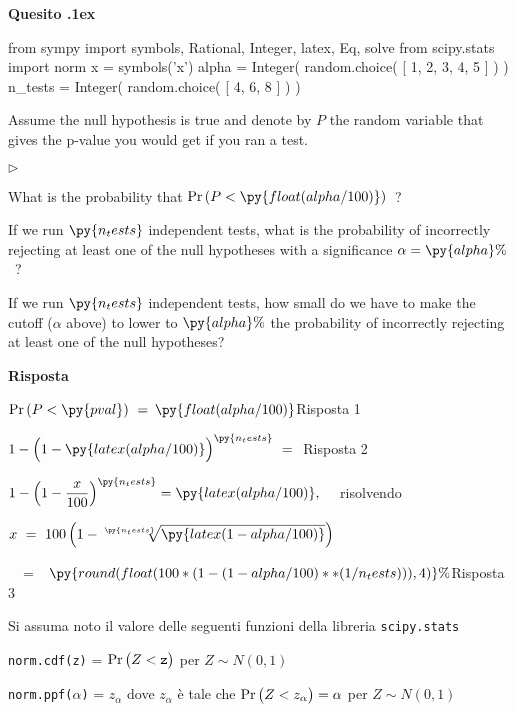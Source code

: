\documentclass[11pt,twoside,a4paper]{article}
\newcommand{\mylabel}[1]{#1\hfill}
\renewenvironment{itemize}
  {\begin{list}{$\triangleright$}{%
   \setlength{\parskip}{0mm}
   \setlength{\topsep}{.4\baselineskip}
   \setlength{\rightmargin}{0mm}
   \setlength{\listparindent}{0mm}
   \setlength{\itemindent}{0mm}
   \setlength{\labelwidth}{2ex}
   \setlength{\itemsep}{.4\baselineskip}
   \setlength{\parsep}{0mm}
   \setlength{\partopsep}{0mm}
   \setlength{\labelsep}{1ex}
   \setlength{\leftmargin}{\labelwidth+\labelsep}
   \let\makelabel\mylabel}}{%
   \end{list}\vspace*{-1.3mm}}
\def\Pr{{\rm Pr\,}}
\newcounter{quesito}
\newenvironment{question}{\bigskip\addtocounter{quesito}{1}\par\textbf{Quesito \thequesito.\kern1ex}}{\vspace{\parskip}}
\newenvironment{answer}{\par\textbf{Risposta\quad}}{\vspace{\parskip}}
\begin{document}
\clearpage
\begin{question} %
\begin{pycode}
from sympy import symbols, Rational, Integer, latex, Eq, solve
from scipy.stats import norm
x = symbols('x')
alpha = Integer( random.choice( [ 1, 2, 3, 4, 5 ] ) )
n_tests = Integer( random.choice( [ 4, 6, 8 ] ) )
\end{pycode}
Assume the null hypothesis is true and denote by $P$ the random variable that gives the p-value you would get if you ran a test.

\begin{itemize}
\item[1.] What is the probability that $\Pr(P<\py{float(alpha/100) })$~?

\item[2.] If we run $\py{n_tests}$ independent tests, what is the probability of incorrectly rejecting at least one of the null hypotheses with a significance $\alpha=\py{alpha}\%$~?

\item[3.] If we run $\py{n_tests}$ independent tests, how small do we have to make the cutoff ($\alpha$ above) to lower to $\py{alpha}\%$ the probability of incorrectly rejecting at least one of the null hypotheses? 
\end{itemize}

\begin{answer}

$\Pr(P<\py{pval})\ =\ ${\color{blue}$\py{float(alpha/100) }$\hfill Risposta 1}


$\displaystyle 1-\Big(1-\py{latex(alpha/100) }\Big)^{\py{n_tests}}\ =\  ${\color{blue} \hfill Risposta 2}

$\displaystyle 1-\Big(1-\frac{x}{100}\Big)^{\py{n_tests}}=\py{latex(alpha/100) }, \quad$ 
risolvendo 

$\displaystyle x\ =\ 100\,\Big( 1-\sqrt[\py{n_tests}]{\py{latex(1-alpha/100) } }\Big)$\medskip

$\displaystyle\phantom{x}\ =$ {\color{blue}$\kern1ex\py{round(float( 100*( 1- (1-alpha/100)**(1/n_tests) ) ), 4) }\%$\hfill Risposta 3}




\end{answer}
\end{question}











\vfill
\hrulefill

Si assuma noto il valore delle seguenti funzioni della libreria {\tt scipy.stats\/}

{\tt norm.cdf(z)} = $\Pr\big(Z<{\tt z}\big)$ per $Z\sim N(0,1)$ 

{\tt norm.ppf($\alpha$)} = $z_\alpha$ dove $z_\alpha$ è tale che $\Pr\big(Z<z_\alpha\big)=\alpha$ per $Z\sim N(0,1)$ 
\end{document}
